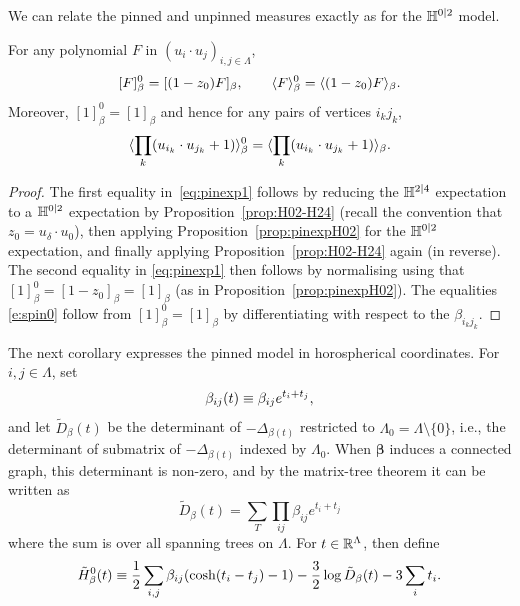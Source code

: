 \documentclass[11pt]{amsart}
\numberwithin{equation}{section}
\numberwithin{theorem}{section}
\newcommand{\V}[1]{\boldsymbol{#1}}
\begin{document}
We can relate the pinned and unpinned measures exactly as for
the $\mathbb{H}^{0|2}$ model.

\begin{proposition}
  \label{prop:pinexp}
For any polynomial $F$ in $(u_{i}\cdot u_{j})_{i,j\in\Lambda}$,
\begin{equation}
  \label{eq:pinexp1}
  [F]_\beta^0 = [(1-z_0)F]_\beta,\qquad
  \langle F \rangle_{\beta}^0
  = \langle (1-z_0) F \rangle_\beta.
\end{equation}
Moreover, $[1]^0_\beta = [1]_\beta$ and hence for any pairs of vertices $i_kj_k$,
\begin{equation} \label{e:spin0}
  \langle \prod_{k} (u_{i_k}\cdot u_{j_k}+1) \rangle^0_\beta
  = \langle \prod_{k} (u_{i_k}\cdot u_{j_k}+1) \rangle_\beta
  .
\end{equation}
\end{proposition}
\begin{proof}
  The first equality in~\eqref{eq:pinexp1} follows by reducing the
  $\mathbb{H}^{2|4}$ expectation to a $\mathbb{H}^{0|2}$ expectation by
  Proposition~\ref{prop:H02-H24} (recall the convention that $z_0 = u_\delta\cdot u_0$),
  then applying 
  Proposition~\ref{prop:pinexpH02} for the $\mathbb{H}^{0|2}$ expectation, and finally applying
  Proposition~\ref{prop:H02-H24} again (in reverse).
  The second equality in \eqref{eq:pinexp1} then follows by normalising
  using that $[1]_\beta^0 = [1-z_0]_\beta = [1]_\beta$ (as  in Proposition~\ref{prop:pinexpH02}).
  The equalities \eqref{e:spin0} follow from $[1]_\beta^0 = [1]_\beta$
  by  differentiating with
  respect to the $\beta_{i_kj_k}$.
\end{proof}

The next corollary expresses the pinned model in horospherical coordinates.
For $i,j \in\Lambda$, set
\begin{equation} \label{e:betat}
  \beta_{ij}(t) \equiv \beta_{ij} e^{t_i+t_j},
\end{equation}
and let $\tilde D_\beta(t)$ be the determinant of $-\Delta_{\beta(t)}$
restricted to $\Lambda_0 = \Lambda \setminus \{0\}$, i.e., the
determinant of submatrix of $-\Delta_{\beta(t)}$ indexed by
$\Lambda_{0}$. When $\V{\beta}$ induces a connected graph, this
determinant is non-zero, and
by the matrix-tree theorem it can be written as 
\begin{equation} \label{e:Dmatrixtree}
  \tilde D_\beta(t) = \sum_T \prod_{ij} \beta_{ij}e^{t_i+t_j}
\end{equation}
where the sum is over all spanning trees on $\Lambda$. For
$t\in \mathbb{R}^\Lambda$, then define
\begin{equation}
  \label{eq:H24-t-field}
  \tilde H_\beta^0(t) \equiv \frac12 \sum_{i,j} \beta_{ij}
  (\cosh(t_i-t_j)-1) - \frac{3}{2} \log \tilde D_\beta(t) - 3\sum_{i}
  t_i. 
\end{equation}
%
\end{document}

